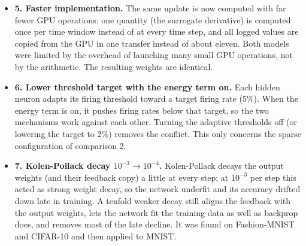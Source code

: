 \documentclass{article}
\begin{document}
{\begin{itemize}
  \item \textbf{5. Faster implementation.} The same update is now computed with far fewer GPU operations: one quantity (the surrogate derivative) is computed once per time window instead of at every time step, and all logged values are copied from the GPU in one transfer instead of about eleven. Both models were limited by the overhead of launching many small GPU operations, not by the arithmetic. The resulting weights are identical.
  \item \textbf{6. Lower threshold target with the energy term on.} Each hidden neuron adapts its firing threshold toward a target firing rate (5\%). When the energy term is on, it pushes firing rates below that target, so the two mechanisms work against each other. Turning the adaptive thresholds off (or lowering the target to 2\%) removes the conflict. This only concerns the sparse configuration of comparison 2.
  \item \textbf{7. Kolen-Pollack decay $10^{-3} \to 10^{-4}$.} Kolen-Pollack decays the output weights (and their feedback copy) a little at every step; at $10^{-3}$ per step this acted as strong weight decay, so the network underfit and its accuracy drifted down late in training. A tenfold weaker decay still aligns the feedback with the output weights, lets the network fit the training data as well as backprop does, and removes most of the late decline. It was found on Fashion-MNIST and CIFAR-10 and then applied to MNIST.
\end{itemize}
}
\end{document}
